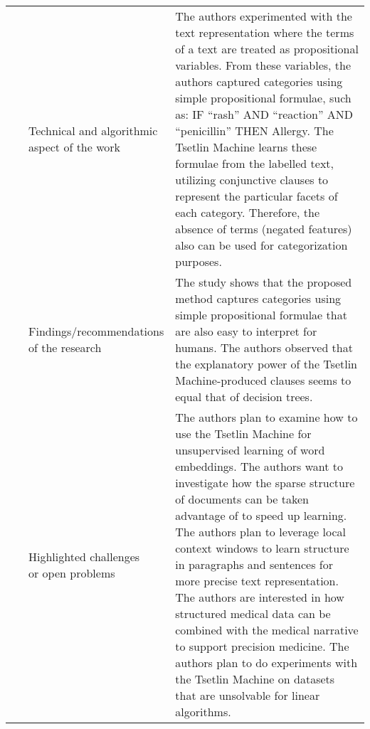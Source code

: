 \begin{landscape}
\begin{longtable}{lp{}p{}}
	\multirow{3}[0]{*}{~\citep{Berge2019}} & 
    \specialcell{Technical and algorithmic \\ aspect of the work} &
	The authors experimented with the text representation where the terms of a text are treated as propositional variables. From these variables, the authors captured categories using simple propositional formulae, such as: IF ``rash'' AND ``reaction'' AND ``penicillin'' THEN Allergy. The Tsetlin Machine learns these formulae from the labelled text, utilizing conjunctive clauses to represent the particular facets of each category. Therefore, the absence of terms (negated features) also can be used for categorization purposes.    
    \\ & 
    \specialcell{Findings/recommendations \\ of the research} & 
	The study shows that the proposed method captures categories using simple propositional formulae that are also easy to interpret for humans. The authors observed that the explanatory power of the Tsetlin Machine-produced clauses seems to equal that of decision trees.
    \\ & 
    \specialcell{Highlighted challenges \\ or open problems} & 
	The authors plan to examine how to use the Tsetlin Machine for unsupervised learning of word embeddings. The authors want to investigate how the sparse structure of documents can be taken advantage of to speed up learning. The authors plan to leverage local context windows to learn structure in paragraphs and sentences for more precise text representation. The authors are interested in how structured medical data can be combined with the medical narrative to support precision medicine. The authors plan to do experiments with the Tsetlin Machine on datasets that are unsolvable for linear algorithms.
	\\
	

\end{longtable}
\end{landscape}
